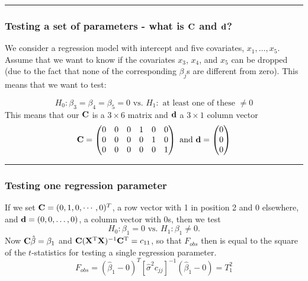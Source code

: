 \documentclass[
]{article}
\begin{document}
\begin{center}\rule{0.5\linewidth}{0.5pt}\end{center}

\hypertarget{testing-a-set-of-parameters---what-is-bf-c-and-bf-d}{%
\subsubsection{\texorpdfstring{Testing a set of parameters - what is
\({\bf C}\) and
\({\bf d}\)?}{Testing a set of parameters - what is \{\textbackslash bf C\} and \{\textbackslash bf d\}?}}\label{testing-a-set-of-parameters---what-is-bf-c-and-bf-d}}

We consider a regression model with intercept and five covariates,
\(x_1, \ldots, x_5\). Assume that we want to know if the covariates
\(x_3\), \(x_4\), and \(x_5\) can be dropped (due to the fact that none
of the corresponding \(\beta_j\)s are different from zero). This means
that we want to test:

\[H_0: \beta_{3}=\beta_{4}=\beta_{5}=0 \text{ vs. } H_1:\text{ at least one of these }\neq 0\]
This means that our \({\bf C}\) is a \(3\times 6\) matrix and
\({\bf d}\) a \(3 \times 1\) column vector
\[ {\bf C}=\begin{pmatrix} 0 &0 &0 &1 &0&0 \\
0&0&0&0&1&0\\
0&0&0&0&0& 1\\
\end{pmatrix} \text{ and } 
{\bf d} =\begin{pmatrix} 0\\0\\0\\ \end{pmatrix}\]

\begin{center}\rule{0.5\linewidth}{0.5pt}\end{center}

\hypertarget{testing-one-regression-parameter}{%
\subsubsection{Testing one regression
parameter}\label{testing-one-regression-parameter}}

If we set \({\bf C}=(0,1, 0, \cdots, 0)^T\), a row vector with 1 in
position 2 and 0 elsewhere, and \({\bf d}=(0,0,\ldots,0)\), a column
vector with 0s, then we test
\[ H_0: \beta_1=0 \text{ vs. } H_1: \beta_1\neq 0.\] Now
\({\bf C}\hat{\beta}=\beta_1\) and
\({\bf C}({\bf X}^{\text T}{\bf X})^{-1}{\bf C}^{\text T}=c_{11}\), so
that \(F_{obs}\) then is equal to the square of the \(t\)-statistics for
testing a single regression parameter.
\[F_{obs}=(\hat{\beta}_1-0)^T[\hat{\sigma}^2 c_{jj}]^{-1}(\hat{\beta}_1-0)=T_1^2\]
\end{document}
